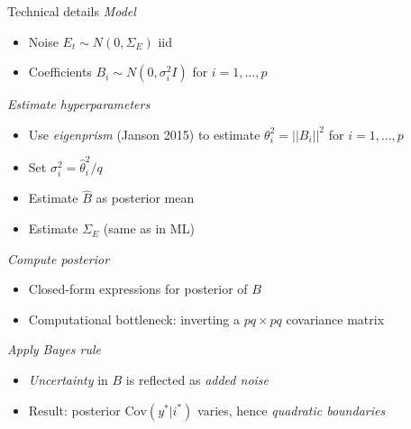 \documentclass[final]{beamer}
\newlength{\sepwid}
\newlength{\onecolwid}
\begin{document}
\begin{frame}[t]
\begin{columns}[t]
\begin{column}{\onecolwid}

\begin{alertblock}{Technical details}
\emph{Model}

\begin{itemize}
\item Noise $E_t \sim N(0, \Sigma_E)$ iid 
\item Coefficients $B_i \sim N(0, \sigma^2_i I)$ for $i = 1, \hdots, p$
\end{itemize}

\emph{Estimate hyperparameters}

\begin{itemize}
\item Use \emph{eigenprism} (Janson 2015) to estimate $\theta_i^2 = ||B_i||^2$ for $i =1,\hdots, p$
\item Set $\sigma^2_i = \hat{\theta}_i^2/q$
\item Estimate $\hat{B}$ as posterior mean
\item Estimate $\Sigma_E$ (same as in ML)
\end{itemize}

\emph{Compute posterior}
\begin{itemize}
\item Closed-form expressions for posterior of $B$
\item Computational bottleneck: inverting a $pq \times pq$ covariance matrix
\end{itemize}

\emph{Apply Bayes rule}

\begin{itemize}
\item \emph{Uncertainty} in $B$ is reflected as \emph{added noise}
\item Result: posterior $\text{Cov}(y^*|i^*)$ varies, hence \emph{quadratic boundaries}
\end{itemize}

\end{alertblock}



\end{column} %

\begin{column}{\sepwid}\end{column} %


\end{columns}
\end{frame}
\end{document}
